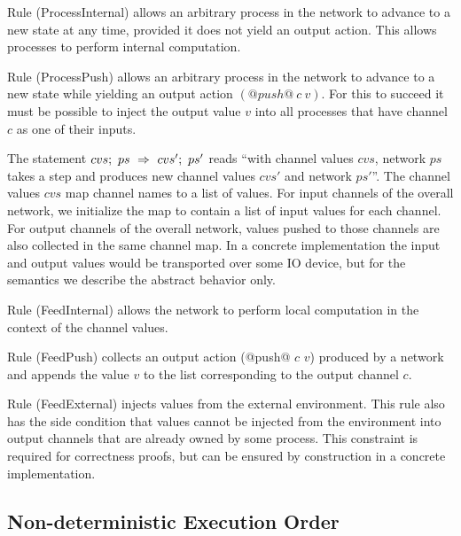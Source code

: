 Rule (ProcessInternal) allows an arbitrary process in the network to advance to a new state at any time, provided it does not yield an output action. This allows processes to perform internal computation.


Rule (ProcessPush) allows an arbitrary process in the network to advance to a new state while yielding an output action $(@push@~c~v)$. For this to succeed it must be possible to inject the output value $v$ into all processes that have channel $c$ as one of their inputs.


The statement $cvs;~ps~\Rightarrow~cvs';~ps'$ reads ``with channel values $cvs$, network $ps$ takes a step and produces new channel values $cvs'$ and network $ps'$''. The channel values $cvs$ map channel names to a list of values. For input channels of the overall network, we initialize the map to contain a list of input values for each channel. For output channels of the overall network, values pushed to those channels are also collected in the same channel map. In a concrete implementation the input and output values would be transported over some IO device, but for the semantics we describe the abstract behavior only.

Rule (FeedInternal) allows the network to perform local computation in the context of the channel values. 

Rule (FeedPush) collects an output action (@push@ $c$ $v$) produced by a network and appends the value $v$ to the list corresponding to the output channel $c$. 

Rule (FeedExternal) injects values from the external environment. This rule also has the side condition that values cannot be injected from the environment into output channels that are already owned by some process. This constraint is required for correctness proofs, but can be ensured by construction in a concrete implementation.


\subsection{Non-deterministic Execution Order}
\label{s:EvaluationOrder}

